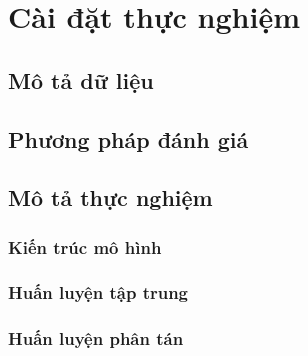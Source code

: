 \chapter{Cài đặt thực nghiệm}
\label{Chapter4}

\section{Mô tả dữ liệu}

\section{Phương pháp đánh giá}

\section{Mô tả thực nghiệm}

\subsection{Kiến trúc mô hình}

\subsection{Huấn luyện tập trung}

\subsection{Huấn luyện phân tán}
